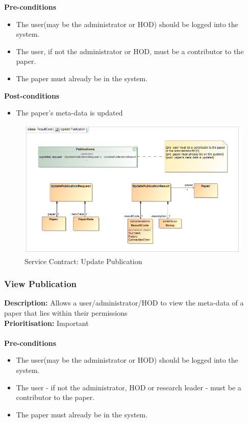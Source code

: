 \documentclass[a4paper]{article}
\begin{document}
        \textbf{Pre-conditions}
         \begin{itemize}
            \item The user(may be the administrator or HOD) should be logged into the system.
            \item The user, if not the administrator or HOD, must be a contributor to the paper.
            \item The paper must already be in the system.
       \end{itemize}
        
        \textbf{Post-conditions}
        \begin{itemize}
            \item The paper's meta-data is updated
        \end{itemize}
        
            	\begin{figure}[H]
            		\centering
            		\includegraphics[width=\textwidth]{../Assignment1/5.1.6.Update.Publication.Services.Contract.png}
            		\caption{Service Contract: Update Publication}
            	\end{figure}
        \pagebreak
    \subsubsection{View Publication}
        
        \textbf{Description:} Allows a user/administrator/HOD to view the meta-data of a paper that lies within their permissions\\
        \textbf{Prioritisation:} Important\\
        \\
        
        \textbf{Pre-conditions}
         \begin{itemize}
            \item The user(may be the administrator or HOD) should be logged into the system.
            \item The user - if not the administrator, HOD or research leader - must be a contributor to the paper.
            \item The paper must already be in the system.
       \end{itemize}
        
\end{document}
